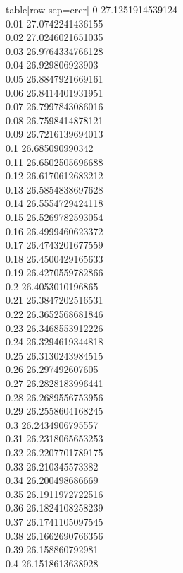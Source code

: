   table[row sep=crcr]{%
0	27.1251914539124\\
0.01	27.0742241436155\\
0.02	27.0246021651035\\
0.03	26.9764334766128\\
0.04	26.929806923903\\
0.05	26.8847921669161\\
0.06	26.8414401931951\\
0.07	26.7997843086016\\
0.08	26.7598414878121\\
0.09	26.7216139694013\\
0.1	26.685090990342\\
0.11	26.6502505696688\\
0.12	26.6170612683212\\
0.13	26.5854838697628\\
0.14	26.5554729424118\\
0.15	26.5269782593054\\
0.16	26.4999460623372\\
0.17	26.4743201677559\\
0.18	26.4500429165633\\
0.19	26.4270559782866\\
0.2	26.4053010196865\\
0.21	26.3847202516531\\
0.22	26.3652568681846\\
0.23	26.3468553912226\\
0.24	26.3294619344818\\
0.25	26.3130243984515\\
0.26	26.297492607605\\
0.27	26.2828183996441\\
0.28	26.2689556753956\\
0.29	26.2558604168245\\
0.3	26.2434906795557\\
0.31	26.2318065653253\\
0.32	26.2207701789175\\
0.33	26.210345573382\\
0.34	26.200498686669\\
0.35	26.1911972722516\\
0.36	26.1824108258239\\
0.37	26.1741105097545\\
0.38	26.1662690766356\\
0.39	26.158860792981\\
0.4	26.1518613638928\\
}
